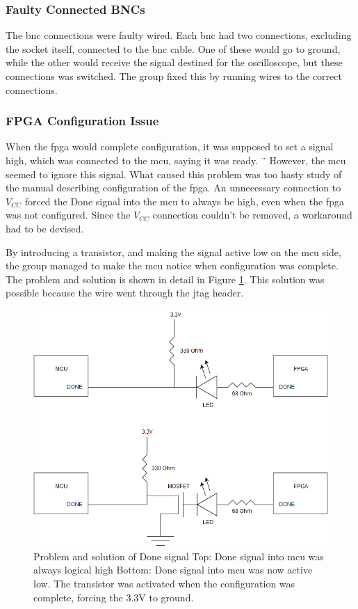 \subsubsection{Faulty Connected BNCs}
The \gls{bnc} connections were faulty wired.
Each \gls{bnc} had two connections, excluding the socket itself, connected to the \gls{bnc} cable.
One of these would go to ground, while the other would receive the signal destined for the oscilloscope, but these connections was switched.
The group fixed this by running wires to the correct connections.

\subsubsection{FPGA Configuration Issue}
When the \gls{fpga} would complete configuration, it was supposed to set a signal high, which was connected to the \gls{mcu}, saying it was ready. ¨
However, the \gls{mcu} seemed to ignore this signal.
What caused this problem was too hasty study of the manual describing configuration of the \gls{fpga}.
An unnecessary connection to \(V_{CC}\) forced the Done signal into the \gls{mcu} to always be high, even when the \gls{fpga} was not configured.
Since the \(V_{CC}\) connection couldn't be removed, a workaround had to be devised.

By introducing a transistor, and making the signal active low on the \gls{mcu} side, the group managed to make the \gls{mcu} notice when configuration was complete.
The problem and solution is shown in detail in Figure \ref{fig:Done Issue}.
This solution was possible because the wire went through the \gls{jtag} header.

\begin{figure}[h!]
\centering
\includegraphics[scale=0.5]{images/Done_Signal_Issue.png}
\caption{Problem and solution of Done signal
         \newline
         Top: Done signal into \gls{mcu} was always logical high
         \newline
         Bottom: Done signal into \gls{mcu} was now active low. The transistor was activated when the configuration was complete, forcing the 3.3V to ground.}
\label{fig:Done Issue}
\end{figure}

